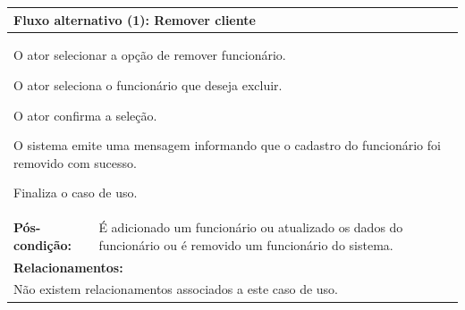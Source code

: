 \documentclass[
	12pt,				%
	openright,
	oneside,			%
	a4paper,			%
	chapter=TITLE,		%
	brazil				%
	]{abntex2}
\begin{document}
\begin{table}[h]
\begin{tabular}{|p{3cm}|p{3cm}|p{3cm}|p{3cm}|}
\multicolumn{4}{|p{12cm}|}{\textbf{Fluxo alternativo (1): Remover cliente }}       				     					\\ \hline
\multicolumn{4}{|p{12cm}|}{%
\begin{alineas}
	\item O ator selecionar a opção de remover funcionário.
	\item O ator seleciona o funcionário que deseja excluir.
	\item O ator confirma a seleção. 
  	\item O sistema emite uma mensagem informando que o cadastro do funcionário foi removido com sucesso.
  	\item Finaliza o caso de uso.
  \end{alineas}}                                                               				 							\\ \hline

\textbf{Pós-condição: }  & \multicolumn{3}{p{9cm}|}{ É adicionado um funcionário ou atualizado os dados do funcionário ou é removido %
														um funcionário do sistema. }		\\ \hline
\multicolumn{4}{|p{12cm}|}{\textbf{Relacionamentos:}}                                        								\\ \hline
\multicolumn{4}{|p{12cm}|}{Não existem relacionamentos associados a este caso de uso.}                                  \\ \hline
\end{tabular}
\end{table}
\end{document}

